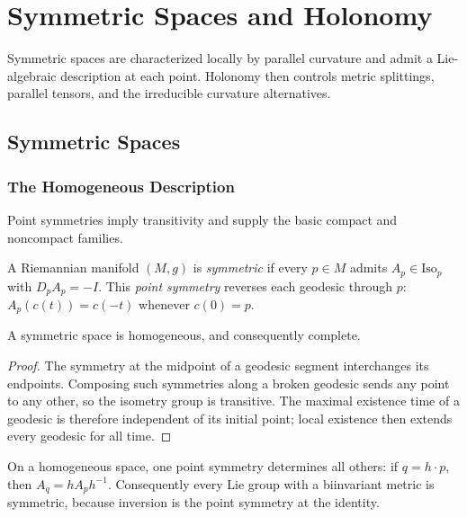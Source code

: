 \chapter{Symmetric Spaces and Holonomy}
\label{chap:pet-symmetric-spaces-and-holonomy}

Symmetric spaces are characterized locally by parallel curvature and admit a
Lie-algebraic description at each point. Holonomy then controls metric
splittings, parallel tensors, and the irreducible curvature alternatives.

\section{Symmetric Spaces}

\subsection{The Homogeneous Description}

Point symmetries imply transitivity and supply the basic compact and
noncompact families.

\begin{definition}
  \label{def:pet-ch10-symmetric-space}
  A Riemannian manifold $(M,g)$ is \emph{symmetric} if every $p\in M$ admits
  $A_p\in\mathrm{Iso}_p$ with $D_pA_p=-I$. This \emph{point symmetry} reverses
  each geodesic through $p$:
  $A_p(c(t))=c(-t)$ whenever $c(0)=p$.
\end{definition}

\begin{proposition}
  \label{prop:pet-ch10-symmetric-homogeneous}
  A symmetric space is homogeneous, and consequently complete.
\end{proposition}
\begin{proof}
  \sketch
  The symmetry at the midpoint of a geodesic segment interchanges its
  endpoints. Composing such symmetries along a broken geodesic sends any point
  to any other, so the isometry group is transitive. The maximal existence
  time of a geodesic is therefore independent of its initial point; local
  existence then extends every geodesic for all time.
\end{proof}

\begin{remark}
  \label{rem:pet-ch10-single-point-symmetry}
  On a homogeneous space, one point symmetry determines all others: if
  $q=h\cdot p$, then $A_q=hA_ph^{-1}$. Consequently every Lie group with a
  biinvariant metric is symmetric, because inversion is the point symmetry at
  the identity.
\end{remark}

